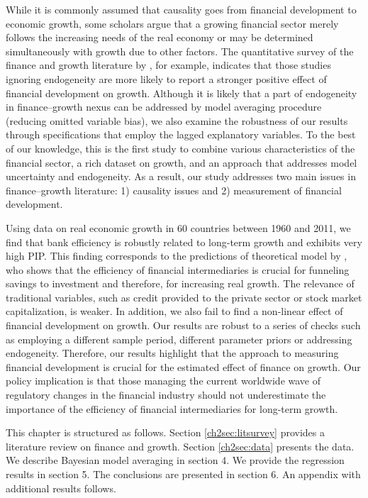 \begin{refsection}
While it is commonly assumed that causality goes from financial development to economic growth, some scholars argue that a growing financial sector merely follows the increasing needs of the real economy or may be determined simultaneously with growth due to other factors. The quantitative survey of the finance and growth literature by \textcite{Valickovaetal2014}, for example, indicates that those studies ignoring endogeneity are more likely to report a stronger positive effect of financial development on growth. Although it is likely that a part of endogeneity in finance--growth nexus can be addressed by model averaging procedure (reducing omitted variable bias), we also examine the robustness of our results through specifications that employ the lagged explanatory variables. To the best of our knowledge, this is the first study to combine various characteristics of the financial sector, a rich dataset on growth, and an approach that addresses model uncertainty and endogeneity. As a result, our study addresses two main issues in finance--growth literature: 1) causality issues and 2) measurement of financial development.

Using data on real economic growth in 60 countries between 1960 and 2011, we find that bank efficiency is robustly related to long-term growth and exhibits very high \ac{PIP}. This finding corresponds to the predictions of theoretical model by \textcite{Pagano1993}, who shows that the efficiency of financial intermediaries is crucial for funneling savings to investment and therefore, for increasing real growth. The relevance of traditional variables, such as credit provided to the private sector or stock market capitalization, is weaker. In addition, we also fail to find a non-linear effect of financial development on growth.  Our results are robust to a series of checks such as employing a different sample period, different parameter priors or addressing endogeneity. Therefore, our results highlight that the approach to measuring financial development is crucial for the estimated effect of finance on growth. Our policy implication is that those managing the current worldwide wave of regulatory changes in the financial industry should not underestimate the importance of the efficiency of financial intermediaries for long-term growth.

This chapter is structured as follows. Section \ref{ch2sec:litsurvey} provides a literature review on finance and growth. Section \ref{ch2sec:data} presents the data. We describe Bayesian model averaging in section 4. We provide the regression results in section 5. The conclusions are presented in section 6. An appendix with additional results follows. 
%
%
% 
%
%

\end{refsection}
